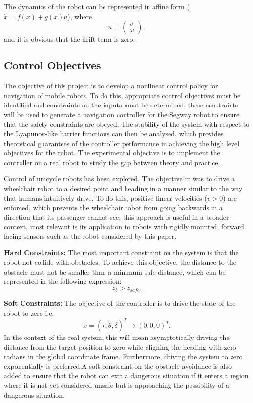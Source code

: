 \documentclass[journal]{IEEEconf}
\begin{document}
The dynamics of the robot can be represented in affine form ($\dot{x}=f(x)+g(x)u$), where \begin{equation}u=\left(\begin{matrix}
v\\\omega \end{matrix}\right),\end{equation} and it is obvious that the drift term is zero. 

\subsection{Control Objectives}
The objective of this project is to develop a nonlinear control policy for navigation of mobile robots. To do this, appropriate control objectives must be identified and constraints on the inputs must be determined; these constraints will be used to generate a navigation controller for the Segway robot to ensure that the safety constraints are obeyed. The stability of the system with respect to the Lyapunov-like barrier functions can then be analysed, which provides theoretical guarantees of the controller performance in achieving the high level objectives for the robot. The experimental objective is to implement the controller on a real robot to study the gap between theory and practice.

Control of unicycle robots has been explored. The objective in \cite{park2011} was to drive a wheelchair robot to a desired point and heading in a manner similar to the way that humans intuitively drive. To do this, positive linear velocities ($v>0$) are enforced, which prevents the wheelchair robot from going backwards in a direction that its passenger cannot see; this approach is useful in a broader context, most relevant is its application to robots with rigidly mounted, forward facing sensors such as the robot considered by this paper.

\textbf{Hard Constraints:} The most important constraint on the system is that the robot not collide with obstacles. To achieve this objective, the distance to the obstacle must not be smaller than a minimum safe distance, which can be represented in the following expression:
\begin{equation}
z_b>z_{safe}.
\end{equation}

\textbf{Soft Constraints:} The objective of the controller is to drive the state of the robot to zero i.e:
\begin{equation} \dot{x}=(\dot{r},\dot{\theta},\dot{\delta})^T \to (0, 0, 0)^T. \end{equation}
In the context of the real system, this will mean asymptotically driving the distance from the target position to zero while aligning the heading with zero radians in the global coordinate frame. Furthermore, driving the system to zero exponentially is preferred.A soft constraint on the obstacle avoidance is also added to ensure that the robot can exit a dangerous situation if it enters a region where it is not yet considered unsafe but is approaching the possibility of a dangerous situation.
\end{document}
